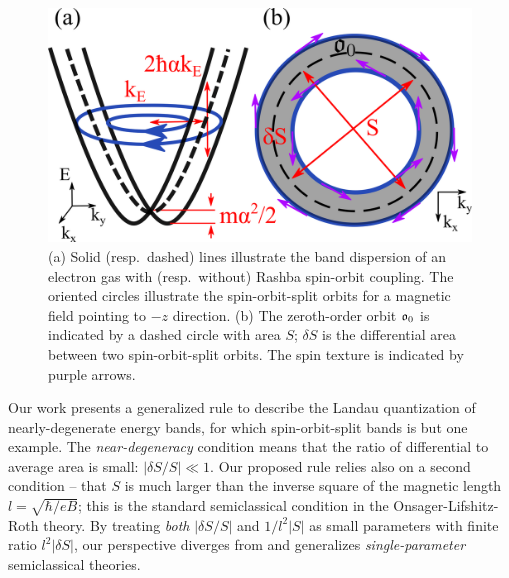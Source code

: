 \documentclass[aps, showpacs, twocolumn, notitlepage, superscriptaddress]{revtex4-1}
\begin{document}
\begin{figure}
\includegraphics[width=0.9\columnwidth]{orbits.png}
\caption{(a) Solid (resp.\ dashed) lines illustrate the band dispersion of an electron gas with (resp.\ without) Rashba spin-orbit coupling.  The oriented circles illustrate the spin-orbit-split orbits for a magnetic field pointing to $-z$ direction. (b) The zeroth-order orbit $\mathfrak{o}_0$ is indicated by a dashed circle with area $S$; $\delta S$ is the differential area  between two spin-orbit-split orbits. The spin texture is indicated by purple arrows.\label{fig:orbits}}
\end{figure}

Our work presents a generalized rule to describe the Landau quantization of nearly-degenerate energy bands, for which  spin-orbit-split bands is but one example. The \textit{near-degeneracy} condition means that
the ratio of differential to average area is small: $|\delta S/S|{\ll}1$. Our proposed rule relies also on a second condition -- that $S$ is much larger than the inverse square of the magnetic length $l{=}\sqrt{\hbar/eB}$; this is the standard semiclassical condition in the Onsager-Lifshitz-Roth theory. By treating \textit{both} $|\delta S/S|$ and $1/l^2|S|$   as small parameters with finite ratio $l^2|\delta S|$, our perspective diverges from and generalizes \textit{single-parameter} semiclassical theories\cite{kohn_effham,blount_effham,rotheffham,wannier_fredkin,fischbeck_review,mikitik_manifestation_1999,topoferm,100p,gao_zero-field_2017}.

\end{document}
